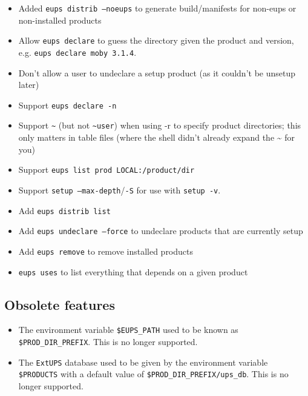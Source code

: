 \documentclass{article}
\newcommand{\code}[1]{\texttt{#1}}
\newcommand{\eups}{\code{ExtUPS}}
\begin{document}
\begin{itemize}
  \item
    Added \code{eups distrib --noeups} to generate build/manifests for non-eups or non-installed products

  \item
    Allow \code{eups declare} to guess the directory given the product and version,
    e.g. \code{eups declare moby 3.1.4}.

  \item
    Don't allow a user to undeclare a setup product (as it couldn't be unsetup later)

  \item
    Support \code{eups declare -n}

  \item
    Support \code{\~} (but not \code{\~{}user}) when using -r to specify product directories;
    this only matters in table files (where the shell didn't already expand
    the \~{} for you)

  \item
    Support \code{eups list prod LOCAL:/product/dir}

  \item
    Support \code{setup --max-depth}/\code{-S} for use with \code{setup -v}.

  \item
    Add \code{eups distrib list}

  \item
    Add \code{eups undeclare --force} to undeclare products that are currently
    setup

  \item
    Add \code{eups remove} to remove installed products

  \item \code{eups uses} to list everything that depends on a given product
    
\end{itemize}

\subsection{Obsolete features}

\begin{itemize}
  \item The environment variable \code{\$EUPS\_PATH} used to be known
  as \code{\$PROD\_DIR\_PREFIX}. This is no longer supported.

  \item The \eups{} database used to be given by the environment variable \code{\$PRODUCTS}
    with a default value of \code{\$PROD\_DIR\_PREFIX/ups\_db}. This is no longer supported.
\end{itemize}
\end{document}
